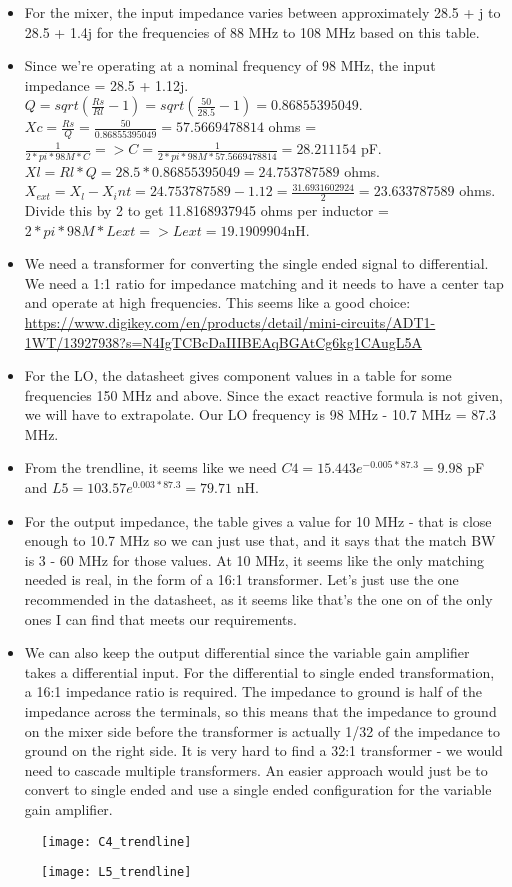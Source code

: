 \documentclass[12pt, letterpaper]{article}
\begin{document}
\begin{itemize}
    \item For the mixer, the input impedance varies between approximately 28.5 + j to 28.5 + 1.4j for the frequencies of 88 MHz to 108 MHz based on this table. 
    \item Since we're operating at a nominal frequency of 98 MHz, the input impedance = 28.5 + 1.12j. \(Q = sqrt(\frac{Rs}{Rl} - 1) = sqrt(\frac{50}{28.5} - 1) = 0.86855395049\). \(Xc = \frac{Rs}{Q} = \frac{50}{0.86855395049} = 57.5669478814 \) ohms = \( \frac{1}{2*pi*98M*C} => C = \frac{1}{2*pi*98M*57.5669478814} = 28.211154 \) pF. \( Xl = Rl*Q = 28.5*0.86855395049 = 24.753787589 \) ohms. \( X_{ext} = X_l - X_int = 24.753787589 - 1.12 = \frac{31.6931602924}{2} = 23.633787589 \) ohms. Divide this by 2 to get 11.8168937945 ohms per inductor = \(2*pi*98M*Lext => Lext = 19.1909904 \)nH.
    \item We need a transformer for converting the single ended signal to differential. We need a 1:1 ratio for impedance matching and it needs to have a center tap and operate at high frequencies. This seems like a good choice: \url{https://www.digikey.com/en/products/detail/mini-circuits/ADT1-1WT/13927938?s=N4IgTCBcDaIIIBEAqBGAtCg6kg1CAugL5A}
    \item For the LO, the datasheet gives component values in a table for some frequencies 150 MHz and above. Since the exact reactive formula is not given, we will have to extrapolate. Our LO frequency is 98 MHz - 10.7 MHz = 87.3 MHz.
    \item From the trendline, it seems like we need \(C4 = 15.443e^{-0.005*87.3} = 9.98\) pF and \(L5 = 103.57e^{0.003*87.3} = 79.71\) nH. 
    \item For the output impedance, the table gives a value for 10 MHz - that is close enough to 10.7 MHz so we can just use that, and it says that the match BW is 3 - 60 MHz for those values. At 10 MHz, it seems like the only matching needed is real, in the form of a 16:1 transformer. Let's just use the one recommended in the datasheet, as it seems like that's the one on of the only ones I can find that meets our requirements. 
    \item We can also keep the output differential since the variable gain amplifier takes a differential input. For the differential to single ended transformation, a 16:1 impedance ratio is required. The impedance to ground is half of the impedance across the terminals, so this means that the impedance to ground on the mixer side before the transformer is actually 1/32 of the impedance to ground on the right side. It is very hard to find a 32:1 transformer - we would need to cascade multiple transformers. An easier approach would just be to convert to single ended and use a single ended configuration for the variable gain amplifier.

\end{itemize}

\begin{figure}[h]
    \texttt{[image: C4\_trendline]}
\end{figure}

\begin{figure}[h]
    \texttt{[image: L5\_trendline]}
\end{figure}
\end{document}
